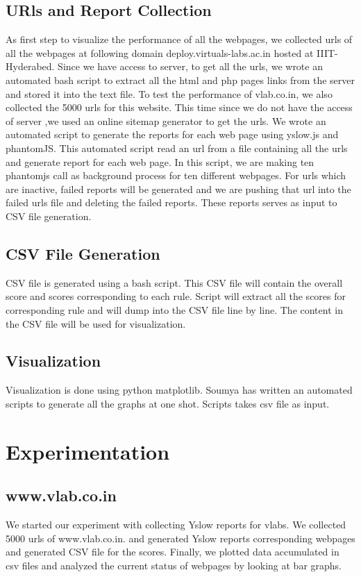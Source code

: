 \documentclass[conference]{IEEEtran}
\begin{document}
\subsection{URls and Report Collection}\label{sec-4.1}
As first step to visualize the performance of all the webpages, we
collected urls of all the webpages at following domain deploy.virtuals-labs.ac.in hosted at
IIIT-Hyderabed. Since we have access to server, to get all the urls, we wrote an
automated bash script to extract all the html and php pages links from the
server and stored it into the text file.
To test the performance of vlab.co.in, we also collected the 5000 urls for this
website. This time since we do not have the access of server ,we used an online
sitemap generator to get the urls.
We wrote an automated script to generate the reports for each web page using
yslow.js and phantomJS. This automated script read an url from a file containing
all the urls and generate report for each web page. In this script, we are making
ten phantomjs call as background process for ten different webpages. For urls which are inactive, failed reports will
be generated and we are pushing that url into the failed urls file and deleting
the failed reports. These reports serves as input to CSV file generation.

\subsection{CSV File Generation}\label{sec-4.2}
CSV file is generated using a bash script. This CSV file will contain the overall
score and scores corresponding to each rule. Script will extract all the scores
for corresponding rule and will dump into the CSV file line by line. The
content in the CSV file will be used for visualization.

\subsection{Visualization}\label{sec-4.3}
Visualization is done using python matplotlib. Soumya has written an automated
scripts to generate all the graphs at one shot. Scripts takes csv file as input.

\section{Experimentation}\label{sec-5}

\subsection{www.vlab.co.in}\label{sec-5.1}
We started our experiment with collecting Yslow reports for vlabs. 
We collected 5000 urls of www.vlab.co.in. and generated
Yslow reports corresponding webpages and generated CSV file for the
scores. Finally, we plotted data accumulated in csv files and analyzed the
current status of webpages by looking at bar graphs.
\end{document}
